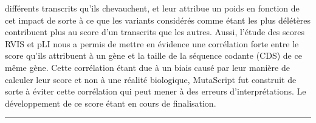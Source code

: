 \documentclass[12pt,twoside]{ugathesis}
\begin{document}
différents transcrits qu'ils chevauchent, et leur attribue un poids en
fonction de cet impact de sorte à ce que les variants considérés comme
étant les plus délétères contribuent plus au score d'un transcrits que
les autres. Aussi, l'étude des scores RVIS et pLI nous a permis de
mettre en évidence une corrélation forte entre le score qu'ils
attribuent à un gène et la taille de la séquence codante (CDS) de ce
même gène. Cette corrélation étant due à un biais causé par leur manière
de calculer leur score et non à une réalité biologique, MutaScript fut
construit de sorte à éviter cette corrélation qui peut mener à des
erreurs d'interprétations. Le développement de ce score étant en cours
de finalisation.

\begin{center}\rule{0.5\linewidth}{\linethickness}\end{center}
\end{document}
